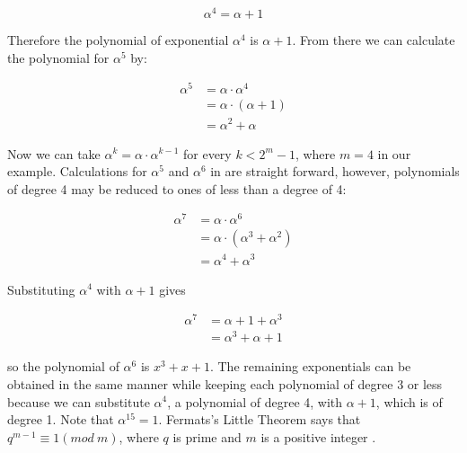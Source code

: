 \documentclass[../main.tex]{subfiles}
\begin{document}
    \begin{equation*}
        \alpha^4 = \alpha + 1
    \end{equation*}

    \noindent
    Therefore the polynomial of exponential ${\alpha^4}$ is ${\alpha + 1}$. From there we can calculate the polynomial for ${\alpha^5}$ by:

    \begin{align*}
        \alpha^5 &= \alpha \cdot \alpha^4 \\
                 &= \alpha \cdot (\alpha + 1) \\
                 &= \alpha^2 + \alpha
    \end{align*}

    \noindent
    Now we can take ${\alpha^k = \alpha \cdot \alpha^{k - 1}}$ for every ${k < 2^m - 1}$, where ${m = 4}$ in our example. Calculations for ${\alpha^5}$ and ${\alpha^6}$ in  are straight forward, however, polynomials of degree 4 may be reduced to ones of less than a degree of 4:

    \begin{align*}
        \alpha^7 &= \alpha \cdot \alpha^6 \\
                 &= \alpha \cdot (\alpha^3 + \alpha^2) \\
                 &= \alpha^4 + \alpha^3
    \end{align*}

    \noindent
    Substituting ${\alpha^4}$ with ${\alpha + 1}$ gives

    \begin{align*}
        \alpha^7 &= \alpha + 1 + \alpha^3 \\
                 &= \alpha^3 + \alpha + 1
    \end{align*}

     \noindent
    so the polynomial of ${\alpha^6}$ is ${x^3 + x + 1}$. The remaining exponentials can be obtained in the same manner while keeping each polynomial of degree 3 or less because we can substitute ${\alpha^4}$, a polynomial of degree 4, with ${\alpha + 1}$, which is of degree 1. Note that ${\alpha^{15} = 1}$. Fermats's Little Theorem says that ${q^{m - 1} \equiv 1 (mod\ m)}$, where ${q}$ is prime and ${m}$ is a positive integer \autocite{blahut1983theory} \autocite{bossert1999channel}.
\end{document}
